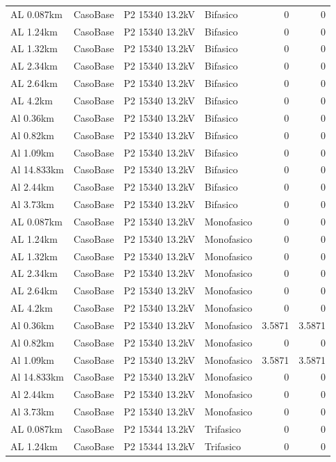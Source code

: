 \documentclass[11pt,a4paper]{article}
\begin{document}
\begin{longtable}{llllrr}
AL 0.087km & CasoBase & P2 15340 13.2kV & Bifasico & 0 & 0 \\
AL 1.24km & CasoBase & P2 15340 13.2kV & Bifasico & 0 & 0 \\
AL 1.32km & CasoBase & P2 15340 13.2kV & Bifasico & 0 & 0 \\
AL 2.34km & CasoBase & P2 15340 13.2kV & Bifasico & 0 & 0 \\
AL 2.64km & CasoBase & P2 15340 13.2kV & Bifasico & 0 & 0 \\
AL 4.2km & CasoBase & P2 15340 13.2kV & Bifasico & 0 & 0 \\
Al 0.36km & CasoBase & P2 15340 13.2kV & Bifasico & 0 & 0 \\
Al 0.82km & CasoBase & P2 15340 13.2kV & Bifasico & 0 & 0 \\
Al 1.09km & CasoBase & P2 15340 13.2kV & Bifasico & 0 & 0 \\
Al 14.833km & CasoBase & P2 15340 13.2kV & Bifasico & 0 & 0 \\
Al 2.44km & CasoBase & P2 15340 13.2kV & Bifasico & 0 & 0 \\
Al 3.73km & CasoBase & P2 15340 13.2kV & Bifasico & 0 & 0 \\
AL 0.087km & CasoBase & P2 15340 13.2kV & Monofasico & 0 & 0 \\
AL 1.24km & CasoBase & P2 15340 13.2kV & Monofasico & 0 & 0 \\
AL 1.32km & CasoBase & P2 15340 13.2kV & Monofasico & 0 & 0 \\
AL 2.34km & CasoBase & P2 15340 13.2kV & Monofasico & 0 & 0 \\
AL 2.64km & CasoBase & P2 15340 13.2kV & Monofasico & 0 & 0 \\
AL 4.2km & CasoBase & P2 15340 13.2kV & Monofasico & 0 & 0 \\
Al 0.36km & CasoBase & P2 15340 13.2kV & Monofasico & 3.5871 & 3.5871 \\
Al 0.82km & CasoBase & P2 15340 13.2kV & Monofasico & 0 & 0 \\
Al 1.09km & CasoBase & P2 15340 13.2kV & Monofasico & 3.5871 & 3.5871 \\
Al 14.833km & CasoBase & P2 15340 13.2kV & Monofasico & 0 & 0 \\
Al 2.44km & CasoBase & P2 15340 13.2kV & Monofasico & 0 & 0 \\
Al 3.73km & CasoBase & P2 15340 13.2kV & Monofasico & 0 & 0 \\
AL 0.087km & CasoBase & P2 15344 13.2kV & Trifasico & 0 & 0 \\
AL 1.24km & CasoBase & P2 15344 13.2kV & Trifasico & 0 & 0 \\

\end{longtable}
\end{document}
